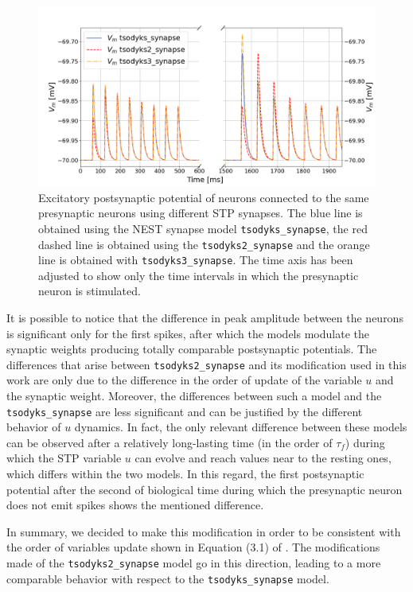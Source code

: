 \documentclass[a4paper, 12pt, twoside, openright]{book}
\begin{document}
\begin{figure}[h]
    \centering
    \includegraphics[width =\columnwidth]{figures/tsodyks_models_comparison.png}
    \caption{Excitatory postsynaptic potential of neurons connected to the same presynaptic neurons using different STP synapses. The blue line is obtained using the NEST synapse model \texttt{tsodyks\_synapse}, the red dashed line is obtained using the \texttt{tsodyks2\_synapse} and the orange line is obtained with \texttt{tsodyks3\_synapse}. The time axis has been adjusted to show only the time intervals in which the presynaptic neuron is stimulated.}
    \label{fig:tsodyks_comparison}
\end{figure}

It is possible to notice that the difference in peak amplitude between the neurons is significant only for the first spikes, after which the models modulate the synaptic weights producing totally comparable postsynaptic potentials. The differences that arise between \texttt{tsodyks2\_synapse} and its modification used in this work are only due to the difference in the order of update of the variable $u$ and the synaptic weight. Moreover, the differences between such a model and the \texttt{tsodyks\_synapse} are less significant and can be justified by the different behavior of $u$ dynamics. In fact, the only relevant difference between these models can be observed after a relatively long-lasting time (in the order of $\tau_f$) during which the STP variable $u$ can evolve and reach values near to the resting ones, which differs within the two models. In this regard, the first postsynaptic potential after the second of biological time during which the presynaptic neuron does not emit spikes shows the mentioned difference.

In summary, we decided to make this modification in order to be consistent with the order of variables update shown in Equation (3.1) of \cite{tsodyks1998}. The modifications made of the \texttt{tsodyks2\_synapse} model go in this direction, leading to a more comparable behavior with respect to the \texttt{tsodyks\_synapse} model. 
\end{document}
